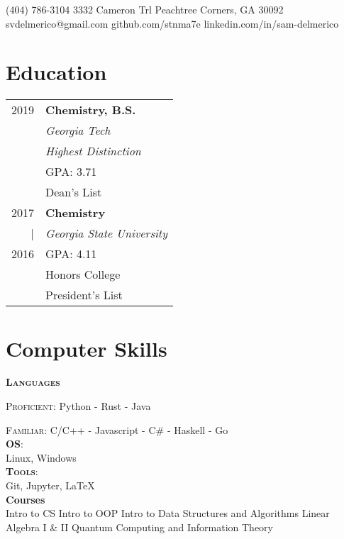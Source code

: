 \documentclass{tccv}
\begin{document}
    {(404) 786-3104}
    {3332 Cameron Trl}
    {Peachtree Corners, GA 30092}
    {svdelmerico@gmail.com}
    {github.com/stnma7e}
    {linkedin.com/in/sam-delmerico}

\begin{minipage}[t]{0.35\textwidth}
    \section{Education}
    \begin{tabular}{rl}
        2019 & \textbf{Chemistry, B.S.} \\
             & \emph{Georgia Tech} \\
             & \emph{Highest Distinction} \\
             & GPA: 3.71 \\
             & Dean's List \\
        
        2017 & \textbf{Chemistry} \\
        |    & \emph{Georgia State University} \\
        2016 & GPA: 4.11 \\
             & Honors College \\
             & President's List
    \end{tabular}
    
         
    \section{Computer Skills}
    \textbf{\textsc{Languages}}
    
    \textsc{Proficient:} Python - Rust - Java
    
    \textsc{Familiar:} 
    {
        C/C++ - Javascript - C\# - Haskell - Go
    } \\
    
    \textbf{\textsc{OS}}:  \\
        Linux, Windows \\
    
    \textbf{\textsc{Tools}}: \\
        Git, Jupyter, \LaTeX{} \\
    
    \textbf{Courses} \\
        Intro to CS \newline
        Intro to OOP \newline
        Intro to Data Structures and Algorithms \newline
        Linear Algebra I \& II \newline
        Quantum Computing and Information Theory
        

\end{minipage}
\end{document}

